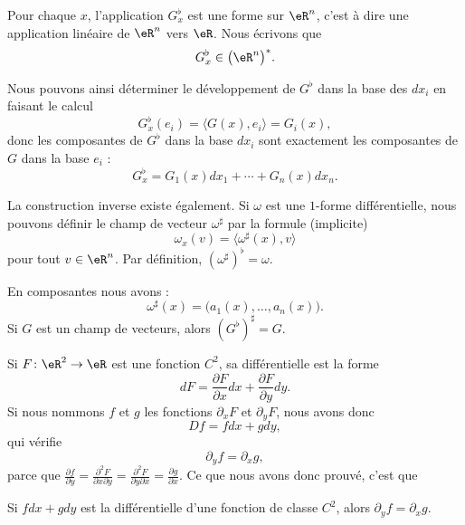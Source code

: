 Pour chaque $x$, l'application $G_x^{\flat}$ est une forme sur $\eR^n$, c'est à dire une application linéaire de $\eR^n$ vers $\eR$. Nous écrivons que
\begin{equation}
	G_x^{\flat}\in\big( \eR^n \big)^*.
\end{equation}

Nous pouvons ainsi déterminer le développement de $G^{\flat}$ dans la base des $dx_i$ en faisant le calcul
\begin{equation}
	G_x^{\flat}(e_i)=\langle G(x), e_i\rangle =G_i(x),
\end{equation}
donc les composantes de $G^{\flat}$ dans la base $dx_i$ sont exactement les composantes de $G$ dans la base $e_i$ :
\begin{equation}
	G^{\flat}_x=G_1(x)dx_1+\cdots+G_n(x)dx_n.
\end{equation}

La construction inverse existe également. Si $\omega$ est une $1$-forme différentielle, nous pouvons définir le champ de vecteur $\omega^{\sharp}$ par la formule (implicite)
\begin{equation}
	\omega_x(v)=\langle \omega^{\sharp}(x), v\rangle 
\end{equation}
pour tout $v\in\eR^n$. Par définition, $(\omega^{\sharp})^{\flat}=\omega$. 

\begin{lemma}
    En composantes nous avons :
	\begin{equation}
		\omega^{\sharp}(x)=\big( a_1(x),\ldots,a_n(x) \big).
	\end{equation}
	Si $G$ est un champ de vecteurs, alors $(G^{\flat})^{\sharp}=G$.
\end{lemma}

Si $F\colon \eR^2\to \eR$ est une fonction $C^2$, sa différentielle est la forme
\begin{equation}
    dF=\frac{ \partial F }{ \partial x }dx+\frac{ \partial F }{ \partial y }dy.
\end{equation}
Si nous nommons $f$ et $g$ les fonctions $\partial_xF$ et $\partial_yF$, nous avons donc
\begin{equation}
    Df=fdx+gdy,
\end{equation}
qui vérifie
\begin{equation}
    \partial_yf=\partial_xg,
\end{equation}
parce que $\frac{ \partial f }{ \partial y }=\frac{ \partial^2F  }{ \partial x\partial y }=\frac{ \partial^2F  }{ \partial y\partial x }=\frac{ \partial g }{ \partial x }$. Ce que nous avons donc prouvé, c'est que 
\begin{lemma}
Si $fdx+gdy$ est la différentielle d'une fonction de classe $C^2$, alors $\partial_yf=\partial_xg$.
\end{lemma}

